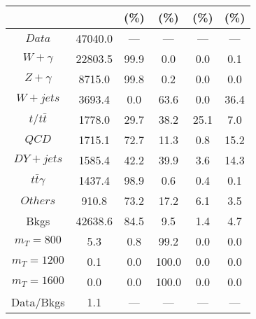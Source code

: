 \begin{figure}
\begin{minipage}[c]{0.32\textwidth}
{\begin{tabular}{cccccc}
 &  & (\%) & (\%) & (\%) & (\%)  \\
\hline
                                                                      $ Data $ &  47040.0 &  --- &  --- &  --- &  ---\\
$ W+\gamma $ &  22803.5 &  99.9 &  0.0 &  0.0 &  0.1\\
$ Z+\gamma $ &  8715.0 &  99.8 &  0.2 &  0.0 &  0.0\\
$ W+jets $ &  3693.4 &  0.0 &  63.6 &  0.0 &  36.4\\
$ t/t\bar{t} $ &  1778.0 &  29.7 &  38.2 &  25.1 &  7.0\\
$ QCD $ &  1715.1 &  72.7 &  11.3 &  0.8 &  15.2\\
$ DY+jets $ &  1585.4 &  42.2 &  39.9 &  3.6 &  14.3\\
$ t\bar{t}\gamma $ &  1437.4 &  98.9 &  0.6 &  0.4 &  0.1\\
$ Others $ &  910.8 &  73.2 &  17.2 &  6.1 &  3.5\\
Bkgs &  42638.6 &  84.5 &  9.5 &  1.4 &  4.7\\
$ m_{T} = 800 $ &  5.3 &  0.8 &  99.2 &  0.0 &  0.0\\
$ m_{T} = 1200 $ &  0.1 &  0.0 &  100.0 &  0.0 &  0.0\\
$ m_{T} = 1600 $ &  0.0 &  0.0 &  100.0 &  0.0 &  0.0\\
Data/Bkgs &  1.1 &  --- &  --- &  --- &  ---\\
\hline
\end{tabular}
}
\end{minipage}
\end{figure}

